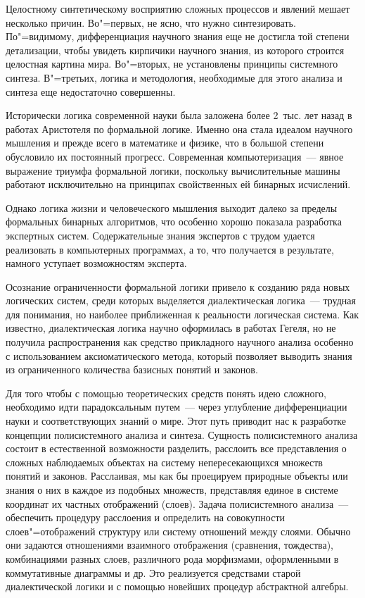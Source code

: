 \documentclass[draft,openany,14pt]{extbook}
\begin{document}
Целостному синтетическому восприятию сложных процессов и явлений мешает несколько причин. Во"=первых, не ясно, что нужно синтезировать. По"=видимому, дифференциация научного знания еще не достигла той степени детализации, чтобы увидеть кирпичики научного знания, из которого строится целостная картина мира. Во"=вторых, не установлены принципы системного синтеза. В"=третьих, логика и методология, необходимые для этого анализа и синтеза еще недостаточно совершенны.

Исторически логика современной науки была заложена более 2~тыс. лет назад в работах Аристотеля по формальной логике. Именно она стала идеалом научного мышления и прежде всего в математике и физике, что в большой степени обусловило их постоянный прогресс. Современная компьютеризация~--- явное выражение триумфа формальной логики, поскольку вычислительные машины работают исключительно на принципах свойственных ей бинарных исчислений.

Однако логика жизни и человеческого мышления выходит далеко за пределы формальных бинарных алгоритмов, что особенно хорошо показала разработка экспертных систем. Содержательные знания экспертов с трудом удается реализовать в компьютерных программах, а то, что получается в результате, намного уступает возможностям эксперта.

Осознание ограниченности формальной логики привело к созданию ряда новых логических систем, среди которых выделяется диалектическая логика~--- трудная для понимания, но наиболее приближенная к реальности логическая система. Как известно, диалектическая логика научно оформилась в работах Гегеля, но не получила распространения как средство прикладного научного анализа особенно с использованием аксиоматического метода, который позволяет выводить знания из ограниченного количества базисных понятий и законов.

Для того чтобы с помощью теоретических средств понять идею сложного, необходимо идти парадоксальным путем~--- через углубление дифференциации науки и соответствующих знаний о мире.  Этот путь приводит нас к разработке концепции полисистемного анализа и синтеза. Сущность полисистемного анализа состоит в естественной возможности разделить, расслоить все представления о сложных наблюдаемых объектах на систему непересекающихся множеств понятий и законов. Расслаивая, мы как бы проецируем природные объекты или знания о них в каждое из подобных множеств, представляя единое в системе координат их частных отображений (слоев). Задача полисистемного анализа~--- обеспечить процедуру расслоения и определить на совокупности слоев"=отображений структуру или систему отношений между слоями. Обычно они задаются отношениями взаимного отображения (сравнения, тождества), комбинациями разных слоев, различного рода морфизмами, оформленными в коммутативные диаграммы и др. Это реализуется средствами старой диалектической логики и с помощью новейших процедур абстрактной алгебры.
\end{document}
